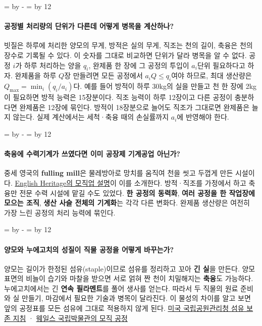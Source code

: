 \documentclass[10pt,a4paper]{article}
\newcommand{\ReserveQuestionSpace}{%
  \par\begingroup
  \dimen0=\pagegoal \advance\dimen0 by -\pagetotal
  \dimen2=\baselineskip \multiply\dimen2 by 12
  \ifdim\dimen0<\dimen2 \newpage\fi
  \endgroup}
\begin{document}
\ReserveQuestionSpace
\paragraph{공정별 처리량의 단위가 다른데 어떻게 병목을 계산하나?}
빗질은 하루에 처리한 양모의 무게, 방적은 실의 무게, 직조는 천의 길이, 축융은 천의 장수로 기록될 수 있다. 이 숫자를 그대로 비교하면 단위가 달라 병목을 알 수 없다. 공정 $i$가 하루 처리하는 양을 $q_i$, 완제품 한 장에 그 공정의 투입이 $a_i$단위 필요하다고 하자. 완제품을 하루 $Q$장 만들려면 모든 공정에서 $a_iQ\leq q_i$여야 하므로, 최대 생산량은 $Q_{\max}=\min_i(q_i/a_i)$다. 예를 들어 방적이 하루 30kg의 실을 만들고 천 한 장에 2kg이 필요하면 방적 능력은 15장분이다. 직조 능력이 하루 12장이고 다른 공정이 충분하다면 완제품은 12장에 묶인다. 방적이 18장분으로 늘어도 직조가 그대로면 완제품은 늘지 않는다. 실제 계산에서는 세척·축융 때의 손실률까지 $a_i$에 반영해야 한다.\par

\ReserveQuestionSpace
\paragraph{축융에 수력기계가 쓰였다면 이미 공장제 기계공업 아닌가?}
중세 영국의 \textbf{fulling mill}은 물레방아로 망치를 움직여 천을 씻고 두껍게 만든 시설이다. \href{https://www.english-heritage.org.uk/visit/inspire-me/ingenious/medieval-ingenuity/}{English Heritage의 모직업 설명}이 이를 소개한다. 방적·직조를 가정에서 하고 축융만 전문 수력 시설에 맡길 수도 있었다. \textbf{한 공정의 동력화}, \textbf{여러 공정을 한 작업장에 모으는 조직}, \textbf{생산 사슬 전체의 기계화}는 각각 다른 변화다. 완제품 생산량은 여전히 가장 느린 공정의 처리 능력에 묶인다.\par

\ReserveQuestionSpace
\paragraph{양모와 누에고치의 성질이 직물 공정을 어떻게 바꾸는가?}

양모는 길이가 한정된 섬유(staple)이므로 섬유를 정리하고 꼬아 \textbf{긴 실}을 만든다. 양모 표면의 비늘이 습기와 마찰을 받으면 서로 얽혀 짠 천이 치밀해지는 \textbf{축융}도 가능하다. 누에고치에서는 긴 \textbf{연속 필라멘트}를 풀어 생사를 얻는다. 따라서 두 직물의 원료 준비와 실 만들기, 마감에서 필요한 기술과 병목이 달라진다. 이 물성의 차이를 알고 보면 앞의 공정표를 모든 섬유에 그대로 적용하지 않게 된다. \href{https://www.nps.gov/subjects/museums/upload/MHI\_AppK\_TextilesObjects.pdf}{미국 국립공원관리청 섬유 보존 지침} · \href{https://museum.wales/wool/about/the-process/}{웨일스 국립박물관의 모직 공정}\par
\end{document}
